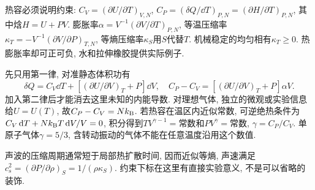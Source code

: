 热容必须说明约束: $C_V=(\partial U/\partial T)_{V,N}$, $C_P=(\delta Q/\dd T)_{P,N}=(\partial H/\partial T)_{P,N}$, 其中焓$H=U+PV$. 膨胀率$\alpha=V^{-1}(\partial V/\partial T)_{P,N}$, 等温压缩率$\kappa_T=-V^{-1}(\partial V/\partial P)_{T,N}$, 等熵压缩率$\kappa_S$用$S$代替$T$. 机械稳定的均匀相有$\kappa_T\ge0$. 热膨胀率却可正可负, 水和拉伸橡胶提供实际例子.

先只用第一律, 对准静态体积功有
\[
\delta Q=C_V\dd T+\left[(\partial U/\partial V)_T+P\right]\dd V,
\quad C_P-C_V=\left[(\partial U/\partial V)_T+P\right]\alpha V.
\]
加入第二律后才能消去这里未知的内能导数. 对理想气体, 独立的微观或实验信息给$U=U(T)$, 故$C_P-C_V=Nk_{\mathrm B}$. 若热容在温区内近似常数, 可逆绝热条件为$C_V\,\mathrm d T+Nk_{\mathrm B} T\,\mathrm d V/V=0$, 积分得到$TV^{\gamma-1}=\text{常数}$和$PV^\gamma=\text{常数}$, $\gamma=C_P/C_V$. 单原子气体$\gamma=5/3$, 含转动振动的气体不能在任意温度沿用这个数值.

声波的压缩周期通常短于局部热扩散时间, 因而近似等熵, 声速满足$c_s^2=(\partial P/\partial\rho)_S=1/(\rho\kappa_S)$. 约束下标在这里有直接实验意义, 不是可以省略的装饰.
